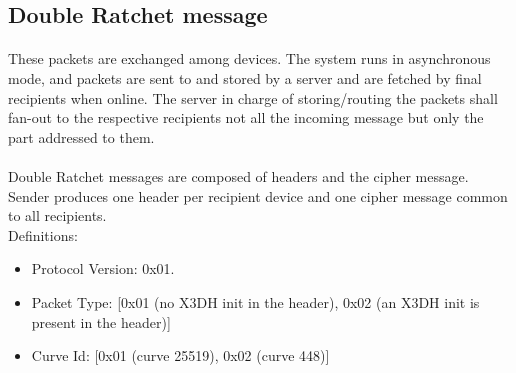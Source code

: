 \documentclass[a4paper,11pt]{article}
\begin{document}
  \subsection{Double Ratchet message}
    \paragraph*{}These packets are exchanged among devices. The system runs in asynchronous mode, and packets are sent to and stored by a server and are fetched by final recipients when online. The server in charge of storing/routing the packets shall fan-out to the respective recipients not all the incoming message but only the part addressed to them.

    \paragraph*{}Double Ratchet messages are composed of headers and the cipher message. Sender produces one header per recipient device and one cipher message common to all recipients.\\
      Definitions:
      \begin{itemize}
      \item Protocol Version: 0x01.
      \item Packet Type: [0x01 (no X3DH init in the header), 0x02 (an X3DH init is present in the header)]
      \item Curve Id: [0x01 (curve 25519), 0x02 (curve 448)]
      \end{itemize}
\end{document}
